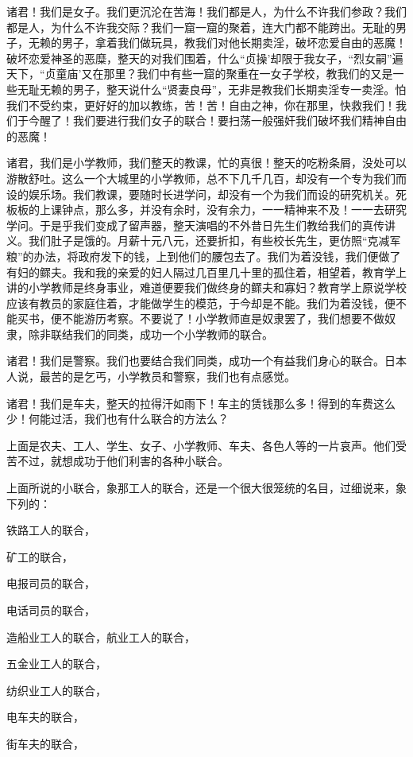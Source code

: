 诸君！我们是女子。我们更沉沦在苦海！我们都是人，为什么不许我们参政？我们都是人，为什么不许我交际？我们一窟一窟的聚着，连大门都不能跨出。无耻的男子，无赖的男子，拿着我们做玩具，教我们对他长期卖淫，破坏恋爱自由的恶魔！破坏恋爱神圣的恶糜，整天的对我们围着，什么“贞操’却限于我女子，“烈女嗣”遍天下，“贞童庙’又在那里？我们中有些一窟的聚重在一女子学校，教我们的又是一些无耻无赖的男子，整天说什么“贤妻良母”，无非是教我们长期卖淫专一卖淫。怕我们不受约束，更好好的加以教练，苦！苦！自由之神，你在那里，快救我们！我们于今醒了！我们要进行我们女子的联合！要扫荡一般强奸我们破坏我们精神自由的恶魔！

诸君，我们是小学教师，我们整天的教课，忙的真很！整天的吃粉条屑，没处可以游散舒吐。这么一个大城里的小学教师，总不下几千几百，却没有一个专为我们而设的娱乐场。我们教课，要随时长进学问，却没有一个为我们而设的研究机关。死板板的上课钟点，那么多，并没有余时，没有余力，一一精神来不及！一一去研究学问。于是乎我们变成了留声器，整天演唱的不外昔日先生们教给我们的真传讲义。我们肚子是饿的。月薪十元八元，还要折扣，有些校长先生，更仿照“克减军粮”的办法，将政府发下的钱，上到他们的腰包去了。我们为着没钱，我们便做了有妇的鳏夫。我和我的亲爱的妇人隔过几百里几十里的孤住着，相望着，教育学上讲的小学教师是终身事业，难道便要我们做终身的鳏夫和寡妇？教育学上原说学校应该有教员的家庭住着，才能做学生的模范，于今却是不能。我们为着没钱，便不能买书，便不能游历考察。不要说了！小学教师直是奴隶罢了，我们想要不做奴隶，除非联结我们的同类，成功一个小学教师的联合。

诸君！我们是警察。我们也要结合我们同类，成功一个有益我们身心的联合。日本人说，最苦的是乞丐，小学教员和警察，我们也有点感觉。

诸君！我们是车夫，整天的拉得汗如雨下！车主的赁钱那么多！得到的车费这么少！何能过活，我们也有什么联合的方法么？

上面是农夫、工人、学生、女子、小学教师、车夫、各色人等的一片哀声。他们受苦不过，就想成功于他们利害的各种小联合。

上面所说的小联合，象那工人的联合，还是一个很大很笼统的名目，过细说来，象下列的：

铁路工人的联合，

矿工的联合，

电报司员的联合，

电话司员的联合，

造船业工人的联合，航业工人的联合，

五金业工人的联合，

纺织业工人的联合，

电车夫的联合，

街车夫的联合，

